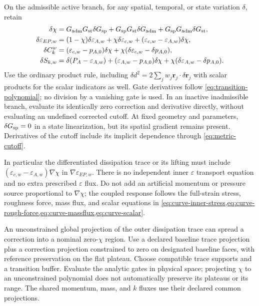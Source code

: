 \documentclass[11pt,a4paper]{article}
\numberwithin{equation}{section}
\newcommand{\eps}{\varepsilon}
\newcommand{\EAw}{\eps_{A,w}}
\newcommand{\ECw}{\eps_{c,w}}
\newcommand{\EEP}{\eps_{EP,w}}
\begin{document}
On the admissible active branch, for any spatial, temporal, or state
variation $\delta$, retain
\begin{align}
 \delta\chi&=G_{\rm adm}G_{\rm st}\delta G_{\rm sp}
 +G_{\rm sp}G_{\rm st}\delta G_{\rm adm}
 +G_{\rm sp}G_{\rm adm}\delta G_{\rm st},\nonumber\\
 \delta\EEP&=(1-\chi)\delta\EAw+\chi\delta\ECw
                 +(\ECw-\EAw)\delta\chi,\nonumber\\
 \delta C_k^w&=(\ECw-p_{A,0})\delta\chi
                   +\chi(\delta\ECw-\delta p_{A,0}),\nonumber\\
 \delta S_{k,w}&=\delta(P_A-\EAw)
            +(\EAw-p_{A,0})\delta\chi
            +\chi(\delta\EAw-\delta p_{A,0}).
 \label{eq:transition-derivatives}
\end{align}
Use the ordinary product rule, including
$\delta d^2=2\sum_jw_j\bm r_j\cdot\delta\bm r_j$
with scalar products for the scalar indicators as well. Gate
derivatives follow \cref{eq:transition-polynomial}; no division by
a vanishing gate is used. In an inactive inadmissible branch, evaluate
its identically zero correction and derivative directly, without
evaluating an undefined corrected cutoff. At fixed geometry and parameters,
$\delta G_{\rm sp}=0$ in a state linearization, but its spatial
gradient remains present. Derivatives of the cutoff include its
implicit dependence through \cref{eq:metric-cutoff}.

In particular the differentiated dissipation trace or its lifting
must include $(\ECw-\EAw)\nabla\chi$ in
$\nabla\EEP$. There is no independent inner $\eps$ transport
equation and no extra prescribed $\eps$ flux. Do not add an artificial
momentum or pressure source proportional to $\nabla\chi$; the
coupled response follows the full-strain stress, roughness force,
mass flux, and scalar equations in
\cref{eq:curve-inner-stress,eq:curve-rough-force,eq:curve-massflux,eq:curve-scalar}.

An unconstrained global projection of the outer dissipation trace
can spread a correction into a nominal zero-$\chi$ region. Use a
declared baseline trace projection plus a correction projection
constrained to zero on designated baseline faces, with reference
preservation on the flat plateau. Choose compatible trace supports
and a transition buffer. Evaluate the analytic gates in physical
space; projecting $\chi$ to an unconstrained polynomial does not
automatically preserve its plateaus or its range. The shared
momentum, mass, and $k$ fluxes use their declared common projections.
\end{document}
